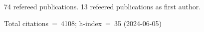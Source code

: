 74 refereed publications. 13 refeered publications as first author.

Total citations~=~4108; h-index~=~35 (2024-06-05)